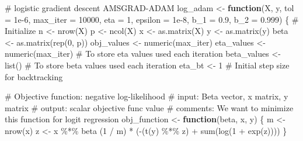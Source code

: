\documentclass[
  letterpaper,
  DIV=11,
  numbers=noendperiod]{scrartcl}
\newenvironment{Shaded}{\begin{snugshade}}{\end{snugshade}}
\newcommand{\AttributeTok}[1]{\textcolor[rgb]{0.40,0.45,0.13}{#1}}
\newcommand{\CommentTok}[1]{\textcolor[rgb]{0.37,0.37,0.37}{#1}}
\newcommand{\ControlFlowTok}[1]{\textcolor[rgb]{0.00,0.23,0.31}{\textbf{#1}}}
\newcommand{\DecValTok}[1]{\textcolor[rgb]{0.68,0.00,0.00}{#1}}
\newcommand{\FloatTok}[1]{\textcolor[rgb]{0.68,0.00,0.00}{#1}}
\newcommand{\FunctionTok}[1]{\textcolor[rgb]{0.28,0.35,0.67}{#1}}
\newcommand{\NormalTok}[1]{\textcolor[rgb]{0.00,0.23,0.31}{#1}}
\newcommand{\OtherTok}[1]{\textcolor[rgb]{0.00,0.23,0.31}{#1}}
\newcommand{\SpecialCharTok}[1]{\textcolor[rgb]{0.37,0.37,0.37}{#1}}
\begin{document}
\begin{Shaded}
\begin{Highlighting}[]
\CommentTok{\# logistic gradient descent AMSGRAD{-}ADAM}
\NormalTok{log\_adam }\OtherTok{\textless{}{-}} \ControlFlowTok{function}\NormalTok{(X, y, }\AttributeTok{tol =} \FloatTok{1e{-}6}\NormalTok{, }\AttributeTok{max\_iter =} \DecValTok{10000}\NormalTok{, }\AttributeTok{eta =} \DecValTok{1}\NormalTok{, }\AttributeTok{epsilon =} \FloatTok{1e{-}8}\NormalTok{, }\AttributeTok{b\_1 =} \FloatTok{0.9}\NormalTok{, }\AttributeTok{b\_2 =} \FloatTok{0.999}\NormalTok{) \{}
  \CommentTok{\# Initialize}
\NormalTok{  n }\OtherTok{\textless{}{-}} \FunctionTok{nrow}\NormalTok{(X)}
\NormalTok{  p }\OtherTok{\textless{}{-}} \FunctionTok{ncol}\NormalTok{(X)}
\NormalTok{  x }\OtherTok{\textless{}{-}} \FunctionTok{as.matrix}\NormalTok{(X)}
\NormalTok{  y }\OtherTok{\textless{}{-}} \FunctionTok{as.matrix}\NormalTok{(y)}
\NormalTok{  beta }\OtherTok{\textless{}{-}} \FunctionTok{as.matrix}\NormalTok{(}\FunctionTok{rep}\NormalTok{(}\DecValTok{0}\NormalTok{, p))}
\NormalTok{  obj\_values }\OtherTok{\textless{}{-}} \FunctionTok{numeric}\NormalTok{(max\_iter)}
\NormalTok{  eta\_values }\OtherTok{\textless{}{-}} \FunctionTok{numeric}\NormalTok{(max\_iter)  }\CommentTok{\# To store eta values used each iteration}
\NormalTok{  beta\_values }\OtherTok{\textless{}{-}} \FunctionTok{list}\NormalTok{() }\CommentTok{\# To store beta values used each iteration}
\NormalTok{  eta\_bt }\OtherTok{\textless{}{-}} \DecValTok{1}  \CommentTok{\# Initial step size for backtracking}
  
  \CommentTok{\# Objective function: negative log{-}likelihood}
  \CommentTok{\# input: Beta vector, x matrix, y matrix}
  \CommentTok{\# output: scalar objective func value}
  \CommentTok{\# comments: We want to minimize this function for logit regression}
\NormalTok{  obj\_function }\OtherTok{\textless{}{-}} \ControlFlowTok{function}\NormalTok{(beta, x, y) \{}
\NormalTok{    m }\OtherTok{\textless{}{-}} \FunctionTok{nrow}\NormalTok{(x)}
\NormalTok{    z }\OtherTok{\textless{}{-}}\NormalTok{ x }\SpecialCharTok{\%*\%}\NormalTok{ beta}
\NormalTok{    (}\DecValTok{1} \SpecialCharTok{/}\NormalTok{ m) }\SpecialCharTok{*}\NormalTok{ (}\SpecialCharTok{{-}}\NormalTok{(}\FunctionTok{t}\NormalTok{(y) }\SpecialCharTok{\%*\%}\NormalTok{ z) }\SpecialCharTok{+} \FunctionTok{sum}\NormalTok{(}\FunctionTok{log}\NormalTok{(}\DecValTok{1} \SpecialCharTok{+} \FunctionTok{exp}\NormalTok{(z))))}
\NormalTok{  \}}
  

\end{Highlighting}
\end{Shaded}
\end{document}
